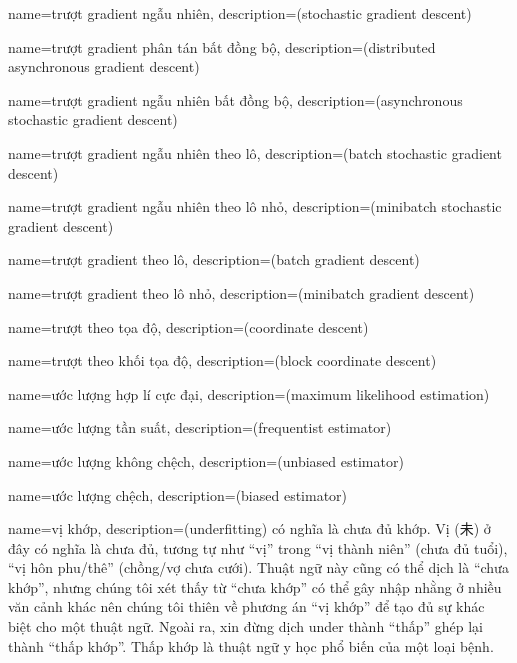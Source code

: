 {
    name={trượt gradient ngẫu nhiên},
    description={(stochastic gradient descent)}
}

{
    name={trượt gradient phân tán bất đồng bộ},
    description={(distributed asynchronous gradient descent)}
}


{
    name={trượt gradient ngẫu nhiên bất đồng bộ},
    description={(asynchronous stochastic gradient descent)}
}

{
    name={trượt gradient ngẫu nhiên theo lô},
    description={(batch stochastic gradient descent)}
}

{
    name={trượt gradient ngẫu nhiên theo lô nhỏ},
    description={(minibatch stochastic gradient descent)}
}

{
    name={trượt gradient theo lô},
    description={(batch gradient descent)}
}

{
    name={trượt gradient theo lô nhỏ},
    description={(minibatch gradient descent)}
}

{
    name={trượt theo tọa độ},
    description={(coordinate descent)}
}

{
    name={trượt theo khối tọa độ},
    description={(block coordinate descent)}
}

{
    name={ước lượng hợp lí cực đại},
    description={(maximum likelihood estimation)}
}

{
    name={ước lượng tần suất},
    description={(frequentist estimator)}
}

{
    name={ước lượng không chệch},
    description={(unbiased estimator)}
}

{
    name={ước lượng chệch},
    description={(biased estimator)}
}

{
    name={vị khớp},
    description={(underfitting) có nghĩa là chưa đủ khớp.
    Vị (未) ở đây có nghĩa là chưa đủ, tương tự như ``vị''
    trong ``vị thành niên'' (chưa đủ tuổi), ``vị hôn phu/thê''
    (chồng/vợ chưa cưới). Thuật ngữ này cũng có thể dịch là
    ``chưa khớp'', nhưng chúng tôi xét thấy từ ``chưa khớp''
    có thể gây nhập nhằng ở nhiều văn cảnh khác nên chúng tôi
    thiên về phương án ``vị khớp'' để tạo đủ sự khác biệt
    cho một thuật ngữ. Ngoài ra, xin đừng dịch under thành ``thấp''
    ghép lại thành ``thấp khớp''. Thấp khớp là thuật ngữ y học
    phổ biến của một loại bệnh.}
}

